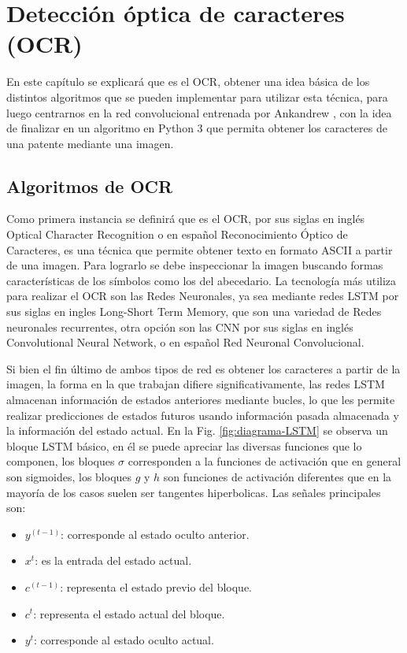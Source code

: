\chapter{Detección óptica de caracteres (OCR)}

En este capítulo se explicará que es el OCR, obtener una idea básica
de los distintos algoritmos que se pueden implementar para
utilizar esta técnica, para luego centrarnos en la red convolucional entrenada por
Ankandrew \cite{ankandrew_reconocedor_2023}, con la idea de finalizar en un algoritmo en Python 3
que permita obtener los caracteres de una patente mediante una imagen.

\section{Algoritmos de OCR}

Como primera instancia se definirá que es el OCR, por sus siglas en inglés Optical Character
Recognition o en español Reconocimiento Óptico de Caracteres, es una técnica que permite
obtener texto en formato ASCII a partir de una imagen.
Para lograrlo se debe inspeccionar la imagen buscando formas características de los símbolos como los del abecedario.
La tecnología más utiliza para realizar el OCR son las Redes Neuronales, ya sea
mediante redes LSTM por sus siglas en ingles Long-Short Term Memory, que son una variedad de Redes
neuronales recurrentes, otra opción son las CNN por sus siglas en inglés Convolutional Neural Network, o en español Red Neuronal Convolucional.

Si bien el fin último de ambos tipos de red es obtener los caracteres a partir de la imagen, la forma en
la que trabajan difiere significativamente, las redes LSTM almacenan información de estados anteriores mediante bucles,
lo que les permite realizar predicciones de estados futuros usando información pasada almacenada y la información
del estado actual. En la Fig. \ref{fig:diagrama-LSTM} se observa un bloque LSTM básico, en él se puede apreciar las diversas funciones que lo componen, los bloques $\sigma$ corresponden a la funciones de activación que en general son sigmoides, los bloques $g$ y $h$ son funciones de activación diferentes que en la mayoría de los casos suelen ser tangentes hiperbolicas.
Las señales principales son:
\begin{itemize}
    \item $y^{(t-1)}$: corresponde al estado oculto anterior.
    \item $x^t$: es la entrada del estado actual.
    \item $c^{(t-1)}$: representa el estado previo del bloque.
    \item $c^t$: representa el estado actual del bloque.
    \item $y^t$: corresponde al estado oculto actual.
\end{itemize}

